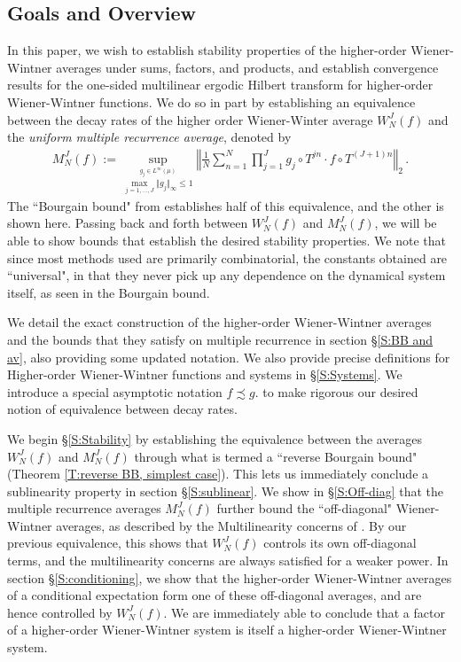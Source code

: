 \documentclass[11pt, oneside]{amsart}   	%
\newcommand{\1}{\mathbbm{1}}
\theoremstyle{definition}
\begin{document}
\subsection{Goals and Overview} In this paper, we wish to establish stability properties of the higher-order Wiener-Wintner averages under sums, factors, and products, and establish convergence results for the one-sided multilinear ergodic Hilbert transform for higher-order Wiener-Wintner functions. We do so in part by establishing an equivalence between the decay rates of the higher order Wiener-Winter average $W_N^J(f)$ and the \textit{uniform multiple recurrence average}, denoted by
\begin{align*}
M_N^J(f) := \sup_{\overset{g_j\in L^\infty(\mu)}{\max_{j=1, \dots, J} \Vert g_j \Vert_\infty \leq 1}}\left\Vert \frac{1}{N}\sum_{n=1}^N \prod_{j=1}^{J} g_j \circ T^{jn} \cdot f\circ T^{(J+1)n}\right \Vert_2 \, .
\end{align*}
The ``Bourgain bound" from \cite{assani2024higherorderwienerwintnersystems} establishes half of this equivalence, and the other is shown here. Passing back and forth between $W_N^J(f)$ and $M_N^J(f)$, we will be able to show bounds that establish the desired stability properties. We note that since most methods used are primarily combinatorial, the constants obtained are ``universal", in that they never pick up any dependence on the dynamical system itself, as seen in the Bourgain bound.

We detail the exact construction of the higher-order Wiener-Wintner averages and the bounds that they satisfy on multiple recurrence in section \S \ref{S:BB and av}, also providing some updated notation. We also provide precise definitions for Higher-order Wiener-Wintner functions and systems in \S \ref{S:Systems}. We introduce a special asymptotic notation $f \precsim g$. to make rigorous our desired notion of equivalence between decay rates.

We begin \S \ref{S:Stability} by establishing the equivalence between the averages $W_N^J(f)$ and $M_N^J(f)$ through what is termed a ``reverse Bourgain bound" (Theorem \ref{T:reverse BB, simplest case}). This lets us immediately conclude a sublinearity property in section \S \ref{S:sublinear}. We show in \S \ref{S:Off-diag} that the multiple recurrence averages $M_N^J(f)$ further bound the ``off-diagonal" Wiener-Wintner averages, as described by the Multilinearity concerns of \cite{assani2024higherorderwienerwintnersystems}. By our previous equivalence, this shows that $W_N^J(f)$ controls its own off-diagonal terms, and the multilinearity concerns are always satisfied for a weaker power. In section \S \ref{S:conditioning}, we show that the higher-order Wiener-Wintner averages of a conditional expectation form one of these off-diagonal averages, and are hence controlled by $W_N^J(f)$. We are immediately able to conclude that a factor of a higher-order Wiener-Wintner system is itself a higher-order Wiener-Wintner system.
\end{document}
